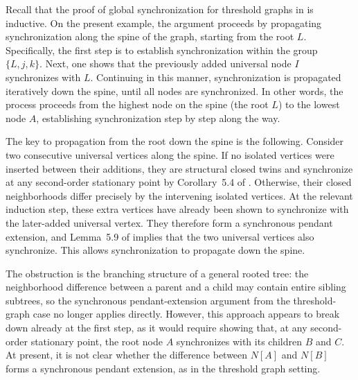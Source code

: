 \documentclass[11pt,reqno]{amsart}
\theoremstyle{definition}
\begin{document}
Recall that the proof of global synchronization for threshold graphs in \cite{wu2025threshold} is inductive.
On the present example, the argument proceeds by propagating synchronization along the spine of the graph, starting from the root $L$. 
Specifically, the first step is to establish synchronization within the group $\{L, j, k\}$.
Next, one shows that the previously added universal node $I$ synchronizes with $L$. 
Continuing in this manner, synchronization is propagated iteratively down the spine, until all nodes are synchronized.
In other words, the process proceeds from the highest node on the spine (the root $L$) to the lowest node $A$, establishing synchronization step by step along the way.

The key to propagation from the root down the spine is the following.
Consider two consecutive universal vertices along the spine.
If no isolated vertices were inserted between their additions,
they are structural closed twins and synchronize at any second-order
stationary point by Corollary~5.4 of \cite{wu2025threshold}.
Otherwise, their closed neighborhoods differ precisely by the
intervening isolated vertices.
At the relevant induction step, these extra vertices have already
been shown to synchronize with the later-added universal vertex.
They therefore form a synchronous pendant extension, and
Lemma~5.9 of \cite{wu2025threshold} implies that the two universal
vertices also synchronize.
This allows synchronization to propagate down the spine.


The obstruction is the branching structure of a general rooted tree: the neighborhood difference between a parent and a child may contain entire sibling subtrees, so the synchronous pendant-extension argument from the threshold-graph case no longer applies directly.
However, this approach appears to break down already at the first step, as it would require showing that, at any second-order stationary point, the root node $A$ synchronizes with its children $B$ and $C$. 
At present, it is not clear whether the difference between $N[A]$ and $N[B]$ forms a synchronous pendant extension, as in the threshold graph setting.
\end{document}
